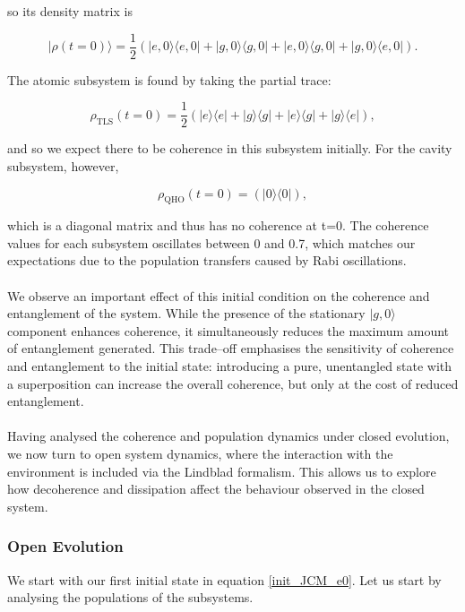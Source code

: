 \documentclass[11pt]{article}
\newcounter{subsubsubsection}[subsubsection]
\begin{document}
so its density matrix is

\begin{equation*}
    |\rho(t=0)\rangle = \frac{1}{2}\left(|e,0\rangle\langle e,0| + |g,0\rangle\langle g,0| + |e,0\rangle\langle g,0| + |g,0\rangle\langle e,0| \right).
\end{equation*}

The atomic subsystem is found by taking the partial trace:

\begin{equation*}
    \rho_{\scriptscriptstyle \text{TLS}}(t = 0) = \frac{1}{2}\left(|e\rangle\langle e|+ |g\rangle\langle g|+|e\rangle\langle g|+|g\rangle\langle e|\right),
\end{equation*}

and so we expect there to be coherence in this subsystem initially. For the cavity subsystem, however, 

\begin{equation*}
    \rho_{\scriptscriptstyle \text{QHO}}(t = 0) = \left(|0\rangle\langle 0|\right),
\end{equation*}

which is a diagonal matrix and thus has no coherence at t=0. The coherence values for each subsystem oscillates between 0 and 0.7, which matches our expectations due to the population transfers caused by Rabi oscillations.\\
\\
We observe an important effect of this initial condition on the coherence and entanglement of the system. While the presence of the stationary $|g,0\rangle$ component enhances coherence, it simultaneously reduces the maximum amount of entanglement generated. This trade--off emphasises the sensitivity of coherence and entanglement to the initial state: introducing a pure, unentangled state with a superposition can increase the overall coherence, but only at the cost of reduced entanglement.\\
\\
Having analysed the coherence and population dynamics under closed evolution, we now turn to open system dynamics, where the interaction with the environment is included via the Lindblad formalism. This allows us to explore how decoherence and dissipation affect the behaviour observed in the closed system.

\subsubsection{Open Evolution}
We start with our first initial state in equation \eqref{init_JCM_e0}. Let us start by analysing the populations of the subsystems. 
\end{document}
